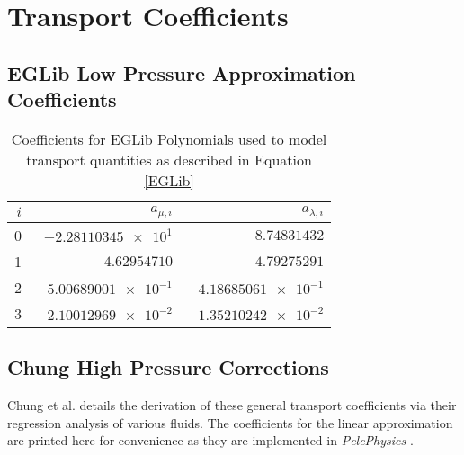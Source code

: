\chapter{Transport Coefficients}
\section*{EGLib Low Pressure Approximation Coefficients} 
\begin{table}[!h]
\caption{Coefficients for EGLib Polynomials \cite{ERN1995105} used to model transport quantities as described in Equation \eqref{EGLib}}
\label{EGLibCoeffs}
\begin{center}
\begin{tabular}{ r || r r }
$i$ & $a_{\mu,i}$& $a_{\lambda,i}$  \\
\hline
0 & $\num{-2.28110345e1}$ & $-8.74831432$  \\
1 & $4.62954710$ & $4.79275291$  \\
2 & $\num{-5.00689001e-1}$ & $\num{-4.18685061e-1}$  \\
3 & $\num{2.10012969e-2}$ & $\num{1.35210242e-2}$  \\
\end{tabular}
\end{center}
\end{table}

\section*{Chung High Pressure Corrections}
Chung et al. \cite{chung:1988} details the derivation of these general transport coefficients via their regression analysis of various fluids. The coefficients for the linear approximation are printed here for convenience as they are implemented in \textit{PelePhysics} \cite{PelePhysics}.  

